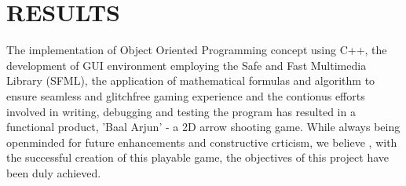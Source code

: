 \section{RESULTS}
The implementation of Object Oriented Programming concept using C++, the development of GUI environment employing the Safe and Fast Multimedia Library (SFML), the application of mathematical formulas and algorithm to ensure seamless and glitchfree gaming experience and the contionus efforts involved in writing, debugging and testing the program has resulted in a functional product, 'Baal Arjun' - a 2D arrow shooting game. While always being openminded for future enhancements and constructive crticism, we believe , with the successful creation of this playable game, the objectives of this project have been duly achieved.

\newpage